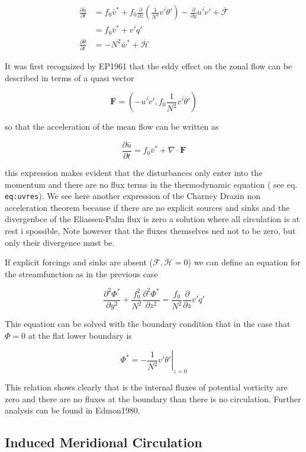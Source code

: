 \[
\begin{aligned}
\frac{\partial \bar{u}}{\partial t} &= f_0 \bar{v}^* +f_0\frac{\partial }{\partial z}
\left(\frac{1}{N^2} \overline{v'\theta'}\right) -
\frac{\partial }{\partial y}\overline{u'v'}   + \overline{\mathcal{F}} \\
&= f_0 \bar{v}^* + \overline{v'q'}\\
\frac{\partial \bar{\theta}}{\partial t} &= -N^2 \bar{w}^*   + \overline{\mathcal{H}}
\end{aligned}
\]

It was first recognized by EP1961 that the eddy effect on the zonal flow
can be described in terms of a quasi vector

\[\mathbf{F} = (-\overline{u'v'}, f_0 \frac{1}{N^2}\overline{v'\theta'})\]

so that the acceleration of the mean flow can be written as

\[\frac{\partial \bar{u}}{\partial t} = f_0\bar{v}^* + \nabla\cdot\mathbf{F}\]

this expression makes evident that the disturbances only enter into the
momentum and there are no flux terms in the thermodynamic equation ( see
eq. \texttt{eq:uvres}). We see here another expression of the Charney
Drazin non acceleration theorem because if there are no explicit sources
and sinks and the divergenbce of the Eliassen-Palm flux is zero a
solution where all circulation is at rest i spossible, Note however that
the fluxes themselves ned not to be zero, but only their divergence must
be.

If explicit forcings and sinks are absent
(\(\overline{\mathcal{F}}, \overline{\mathcal{H}} = 0\)) we can define
an equation for the streamfunction as in the previous case

\[
\frac{\partial^{2} \Phi^*}{\partial y^{2}} +\frac{f_0^2}{N^2}\frac{\partial^{2} \Phi^*}{\partial z^{2}} = \frac{f_0}{N^2}\frac{\partial }{\partial z} \overline{v'q'}
\]

This equation can be solved with the boundary condition that in the case
that \(\Phi = 0\) at the flat lower boundary is

\[\Phi^* = -\left.\frac{1}{N^2}\overline{v'\theta'}\right|_{z=0}\]

This relation shows clearly that is the internal fluxes of potential
vorticity are zero and there are no fluxes at the boundary than there is
no circulation. Further analysis can be found in Edmon1980.


\subsection{Induced Meridional Circulation}\label{induced-meridional-circulation}

